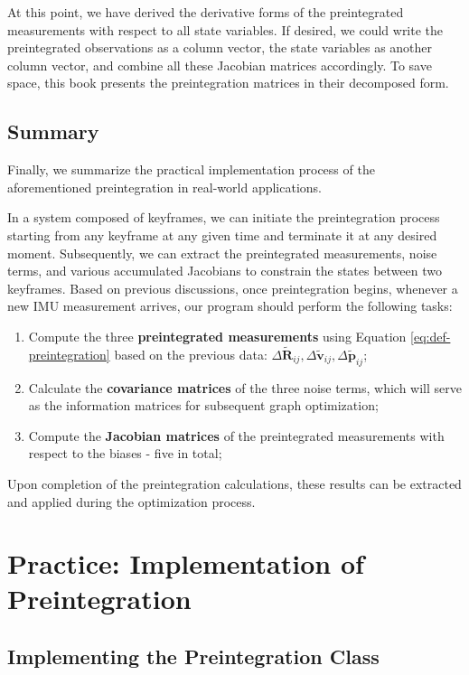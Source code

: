 At this point, we have derived the derivative forms of the preintegrated measurements with respect to all state variables. If desired, we could write the preintegrated observations as a column vector, the state variables as another column vector, and combine all these Jacobian matrices accordingly. To save space, this book presents the preintegration matrices in their decomposed form.

\subsection{Summary}
Finally, we summarize the practical implementation process of the aforementioned preintegration in real-world applications.

In a system composed of keyframes, we can initiate the preintegration process starting from any keyframe at any given time and terminate it at any desired moment. Subsequently, we can extract the preintegrated measurements, noise terms, and various accumulated Jacobians to constrain the states between two keyframes. Based on previous discussions, once preintegration begins, whenever a new IMU measurement arrives, our program should perform the following tasks:
\begin{enumerate}
	\item 
	Compute the three \textbf{preintegrated measurements} using Equation \eqref{eq:def-preintegration} based on the previous data: $\Delta \tilde{\mathbf{R}}_{ij}, \Delta \tilde{\mathbf{v}}_{ij}, \Delta \tilde{\mathbf{p}}_{ij}$;
	\item Calculate the \textbf{covariance matrices} of the three noise terms, which will serve as the information matrices for subsequent graph optimization;
	\item Compute the \textbf{Jacobian matrices} of the preintegrated measurements with respect to the biases - five in total;
\end{enumerate}

Upon completion of the preintegration calculations, these results can be extracted and applied during the optimization process.

\section{Practice: Implementation of Preintegration}
\subsection{Implementing the Preintegration Class}

